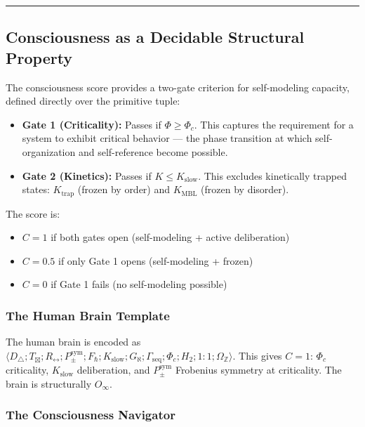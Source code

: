 \documentclass[12pt,a4paper]{article}
\begin{document}
\begin{center}
\rule{0.5\textwidth}{0.4pt}
\end{center}

\subsection{Consciousness as a Decidable Structural Property}

The consciousness score provides a two-gate criterion for self-modeling capacity, defined directly over the primitive tuple:

\begin{itemize}
    \item \textbf{Gate 1 (Criticality):} Passes if $\Phi \geq \Phi_c$. This captures the requirement for a system to exhibit critical behavior --- the phase transition at which self-organization and self-reference become possible.
    \item \textbf{Gate 2 (Kinetics):} Passes if $K \leq K_{\text{slow}}$. This excludes kinetically trapped states: $K_{\text{trap}}$ (frozen by order) and $K_{\text{MBL}}$ (frozen by disorder).
\end{itemize}

The score is:

\begin{itemize}
    \item $C = 1$ if both gates open (self-modeling + active deliberation)
    \item $C = 0.5$ if only Gate 1 opens (self-modeling + frozen)
    \item $C = 0$ if Gate 1 fails (no self-modeling possible)
\end{itemize}

\subsubsection{The Human Brain Template}

The human brain is encoded as $\langle D_{\triangle}; T_{\boxtimes}; R_{\leftrightarrow}; P_{\pm}^{\text{sym}}; F_{\hbar}; K_{\text{slow}}; G_{\aleph}; \Gamma_{\text{seq}}; \Phi_c; H_2; 1{:}1; \Omega_\mathbb{Z} \rangle$. This gives $C = 1$: $\Phi_c$ criticality, $K_{\text{slow}}$ deliberation, and $P_{\pm}^{\text{sym}}$ Frobenius symmetry at criticality. The brain is structurally $O_{\infty}$.

\subsubsection{The Consciousness Navigator}
\end{document}
